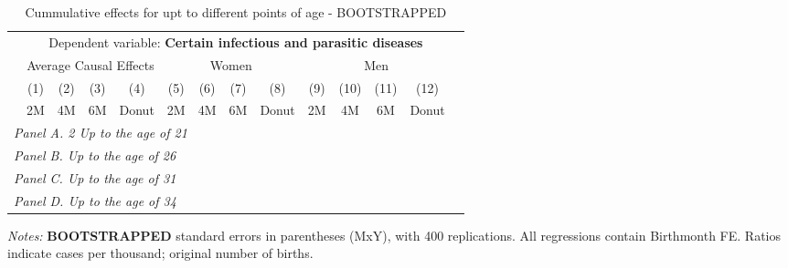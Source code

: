  \begin{table}[H] \begin{threeparttable} \centering \caption{Cummulative effects for upt to different points of age - BOOTSTRAPPED} {\def\sym#1{\ifmmode^{#1}\else\(^{#1}\)\fi} \begin{tabular}{l*{13}{c}} \toprule & \multicolumn{12}{c}{Dependent variable: \textbf{Certain infectious and parasitic diseases}} \\ \cmidrule(lr){2-13}
            &\multicolumn{4}{c}{Average Causal Effects}         &\multicolumn{4}{c}{Women}                          &\multicolumn{4}{c}{Men}                            \\\cmidrule(lr){2-5}\cmidrule(lr){6-9}\cmidrule(lr){10-13}
            &\multicolumn{1}{c}{(1)}&\multicolumn{1}{c}{(2)}&\multicolumn{1}{c}{(3)}&\multicolumn{1}{c}{(4)}&\multicolumn{1}{c}{(5)}&\multicolumn{1}{c}{(6)}&\multicolumn{1}{c}{(7)}&\multicolumn{1}{c}{(8)}&\multicolumn{1}{c}{(9)}&\multicolumn{1}{c}{(10)}&\multicolumn{1}{c}{(11)}&\multicolumn{1}{c}{(12)}\\
            &\multicolumn{1}{c}{2M}&\multicolumn{1}{c}{4M}&\multicolumn{1}{c}{6M}&\multicolumn{1}{c}{Donut}&\multicolumn{1}{c}{2M}&\multicolumn{1}{c}{4M}&\multicolumn{1}{c}{6M}&\multicolumn{1}{c}{Donut}&\multicolumn{1}{c}{2M}&\multicolumn{1}{c}{4M}&\multicolumn{1}{c}{6M}&\multicolumn{1}{c}{Donut}\\
\midrule
 \multicolumn{13}{l}{\emph{Panel A. 2 Up to the age of 21}} \\   \midrule\multicolumn{13}{l}{\emph{Panel B. Up to the age of 26}} \\   \midrule\multicolumn{13}{l}{\emph{Panel C. Up to the age of 31}} \\   \midrule\multicolumn{13}{l}{\emph{Panel D. Up to the age of 34}} \\   
\bottomrule \end{tabular} } \begin{tablenotes} \item \scriptsize \emph{Notes:} \textbf{BOOTSTRAPPED} standard errors in parentheses (MxY), with 400 replications. All regressions contain Birthmonth FE. Ratios indicate cases per thousand; original number of births. \end{tablenotes} \end{threeparttable} \end{table} 
